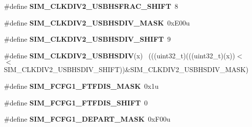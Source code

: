 \begin{DoxyCompactItemize}
\item 
\hypertarget{group___s_i_m___register___masks_ga459e7278762c9e46970c1e4bc0021ee1}{}\#define {\bfseries S\+I\+M\+\_\+\+C\+L\+K\+D\+I\+V2\+\_\+\+U\+S\+B\+H\+S\+F\+R\+A\+C\+\_\+\+S\+H\+I\+F\+T}~8\label{group___s_i_m___register___masks_ga459e7278762c9e46970c1e4bc0021ee1}

\item 
\hypertarget{group___s_i_m___register___masks_ga23bc93a6d06f9c29bb9c140645c57d26}{}\#define {\bfseries S\+I\+M\+\_\+\+C\+L\+K\+D\+I\+V2\+\_\+\+U\+S\+B\+H\+S\+D\+I\+V\+\_\+\+M\+A\+S\+K}~0x\+E00u\label{group___s_i_m___register___masks_ga23bc93a6d06f9c29bb9c140645c57d26}

\item 
\hypertarget{group___s_i_m___register___masks_ga5fcd93b5580791f93521c435e6831d87}{}\#define {\bfseries S\+I\+M\+\_\+\+C\+L\+K\+D\+I\+V2\+\_\+\+U\+S\+B\+H\+S\+D\+I\+V\+\_\+\+S\+H\+I\+F\+T}~9\label{group___s_i_m___register___masks_ga5fcd93b5580791f93521c435e6831d87}

\item 
\hypertarget{group___s_i_m___register___masks_ga6a23cfae422adbbe5ec907e15e347800}{}\#define {\bfseries S\+I\+M\+\_\+\+C\+L\+K\+D\+I\+V2\+\_\+\+U\+S\+B\+H\+S\+D\+I\+V}(x)                                ~(((uint32\+\_\+t)(((uint32\+\_\+t)(x))$<$$<$S\+I\+M\+\_\+\+C\+L\+K\+D\+I\+V2\+\_\+\+U\+S\+B\+H\+S\+D\+I\+V\+\_\+\+S\+H\+I\+F\+T))\&S\+I\+M\+\_\+\+C\+L\+K\+D\+I\+V2\+\_\+\+U\+S\+B\+H\+S\+D\+I\+V\+\_\+\+M\+A\+S\+K)\label{group___s_i_m___register___masks_ga6a23cfae422adbbe5ec907e15e347800}

\item 
\hypertarget{group___s_i_m___register___masks_gab34121e4c8ce51059e13b64bdf460cbf}{}\#define {\bfseries S\+I\+M\+\_\+\+F\+C\+F\+G1\+\_\+\+F\+T\+F\+D\+I\+S\+\_\+\+M\+A\+S\+K}~0x1u\label{group___s_i_m___register___masks_gab34121e4c8ce51059e13b64bdf460cbf}

\item 
\hypertarget{group___s_i_m___register___masks_gaf358f929454ebd6d726a0f79bdf5a715}{}\#define {\bfseries S\+I\+M\+\_\+\+F\+C\+F\+G1\+\_\+\+F\+T\+F\+D\+I\+S\+\_\+\+S\+H\+I\+F\+T}~0\label{group___s_i_m___register___masks_gaf358f929454ebd6d726a0f79bdf5a715}

\item 
\hypertarget{group___s_i_m___register___masks_ga7b4c8f63810498cd22002a2f3b1bdc0d}{}\#define {\bfseries S\+I\+M\+\_\+\+F\+C\+F\+G1\+\_\+\+D\+E\+P\+A\+R\+T\+\_\+\+M\+A\+S\+K}~0x\+F00u\label{group___s_i_m___register___masks_ga7b4c8f63810498cd22002a2f3b1bdc0d}


\end{DoxyCompactItemize}
